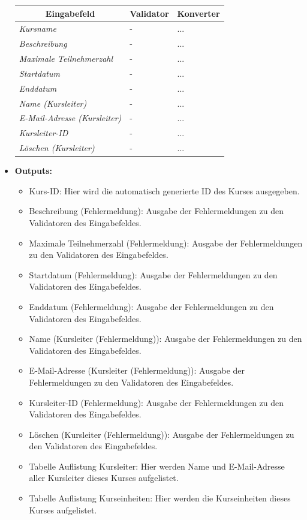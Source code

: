 \begin{itemize}
				\begin{center}
					\begin{longtable}{|p{3cm} |p{8cm} | p{5cm}|}
						
						\hline \multicolumn{1}{|c|}{\textbf{Eingabefeld}} & \multicolumn{1}{|c|}{\textbf{Validator}} & \multicolumn{1}{|c|}{\textbf{Konverter}} \\ \hline
						\endfirsthead
						\hline
						\endlastfoot
						\textit{Kursname} & - & ... \\ \hline
						\textit{Beschreibung} & - & ... \\ \hline
						\textit{Maximale Teilnehmerzahl} & - & ... \\ \hline
						\textit{Startdatum} & - & ... \\ \hline
						\textit{Enddatum} & - & ... \\ \hline
						\textit{Name (Kursleiter)} & - & ... \\ \hline
						\textit{E-Mail-Adresse (Kursleiter)} & - & ... \\ \hline
						\textit{Kursleiter-ID} & - & ... \\ \hline
						\textit{Löschen (Kursleiter)} & - & ... \\ \hline
					\end{longtable}
				\end{center}
				
			\item \textbf{Outputs:}
				\begin{itemize}
					\item Kurs-ID: Hier wird die automatisch generierte ID des Kurses ausgegeben.
					\item Beschreibung (Fehlermeldung): Ausgabe der Fehlermeldungen zu den Validatoren des Eingabefeldes.
					\item Maximale Teilnehmerzahl (Fehlermeldung): Ausgabe der Fehlermeldungen zu den Validatoren des Eingabefeldes.
					\item Startdatum (Fehlermeldung): Ausgabe der Fehlermeldungen zu den Validatoren des Eingabefeldes.
					\item Enddatum (Fehlermeldung): Ausgabe der Fehlermeldungen zu den Validatoren des Eingabefeldes.
					\item Name (Kursleiter (Fehlermeldung)): Ausgabe der Fehlermeldungen zu den Validatoren des Eingabefeldes.
					\item E-Mail-Adresse (Kursleiter (Fehlermeldung)): Ausgabe der Fehlermeldungen zu den Validatoren des Eingabefeldes.
					\item Kursleiter-ID (Fehlermeldung): Ausgabe der Fehlermeldungen zu den Validatoren des Eingabefeldes.
					\item Löschen (Kursleiter (Fehlermeldung)): Ausgabe der Fehlermeldungen zu den Validatoren des Eingabefeldes.
					\item Tabelle Auflistung Kursleiter: Hier werden Name und E-Mail-Adresse aller Kursleiter dieses Kurses aufgelistet.
					\item Tabelle Auflistung Kurseinheiten: Hier werden die Kurseinheiten dieses Kurses aufgelistet.
				\end{itemize}
				

\end{itemize}
